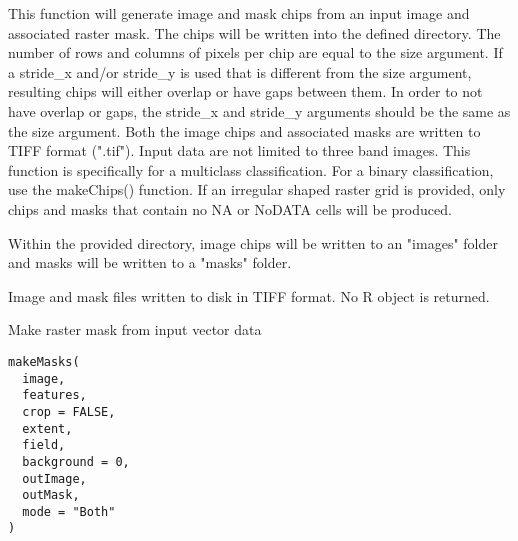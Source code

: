 \documentclass[a4paper]{book}
\begin{document}
%
\begin{Details}\relax
This function will generate image and mask chips from an input image and
associated raster mask. The chips will be written into the defined directory.
The number of rows and columns of pixels per chip are equal to the size argument.
If a stride\_x and/or stride\_y is used that is different from the size argument,
resulting chips will either overlap or have gaps between them. In order to
not have overlap or gaps, the stride\_x and stride\_y arguments should be the
same as the size argument. Both the image chips and associated masks are
written to TIFF format (".tif"). Input data are not limited to three
band images. This function is specifically for a multiclass classification.
For a binary classification, use the makeChips() function. If an irregular shaped
raster grid is provided, only chips and masks that contain no NA or NoDATA
cells will be produced.

Within the provided directory, image chips will be written to an "images" folder
and masks will be written to a "masks" folder.
\end{Details}
%
\begin{Value}
Image and mask files written to disk in TIFF format. No R object is
returned.
\end{Value}
%
\begin{Description}\relax
Make raster mask from input vector data
\end{Description}
%
\begin{Usage}
\begin{verbatim}
makeMasks(
  image,
  features,
  crop = FALSE,
  extent,
  field,
  background = 0,
  outImage,
  outMask,
  mode = "Both"
)
\end{verbatim}
\end{Usage}
%
\end{document}
